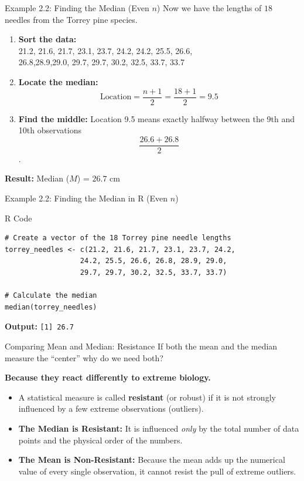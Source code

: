 \documentclass[aspectratio=169]{beamer}
\begin{document}
\begin{frame}{Example 2.2: Finding the Median (Even $n$)}
Now we have the lengths of $18$ needles from the Torrey pine species.
\vspace{0.1cm}
\begin{enumerate}
    \item \textbf{Sort the data:} \\
    {\small 21.2, 21.6, 21.7, 23.1, 23.7, 24.2, 24.2, 25.5, 26.6,\\
	       26.8,28.9,29.0, 29.7, 29.7, 30.2, 32.5, 33.7, 33.7}
    \item \textbf{Locate the median:}
    $$ \text{Location} = \frac{n+1}{2} = \frac{18+1}{2} = 9.5 $$
    \item \textbf{Find the middle:} Location 9.5 means exactly halfway between the 9th and 10th observations $$\frac{26.6 + 26.8}{2}$$.
\end{enumerate}
\vspace{0.2cm}
\textbf{Result:} Median ($M$) = $26.7\text{ cm}$
\end{frame}

\begin{frame}[fragile]{Example 2.2: Finding the Median in R (Even $n$)}
 \begin{block}{R Code}
 \begin{verbatim}
# Create a vector of the 18 Torrey pine needle lengths
torrey_needles <- c(21.2, 21.6, 21.7, 23.1, 23.7, 24.2, 
                  24.2, 25.5, 26.6, 26.8, 28.9, 29.0, 
                  29.7, 29.7, 30.2, 32.5, 33.7, 33.7)

# Calculate the median
median(torrey_needles)
\end{verbatim}
\end{block}
\textbf{Output:}
\texttt{[1] 26.7}
\end{frame}



\begin{frame}{Comparing Mean and Median: Resistance}
If both the mean and the median measure the ``center'' why do we need both? 

\textbf{Because they react differently to extreme biology.}
\vspace{0.3cm}
\begin{itemize}
	\item A statistical measure is called \textbf{resistant} (or robust) if it is not strongly influenced by a few extreme observations (outliers).
	\item \textbf{The Median is Resistant:} It is influenced \emph{only} by the total number of data points and the physical order of the numbers.
	\item \textbf{The Mean is Non-Resistant:} Because the mean adds up the numerical value of every single observation, it cannot resist the pull of extreme outliers.
\end{itemize}
\end{frame}
\end{document}
